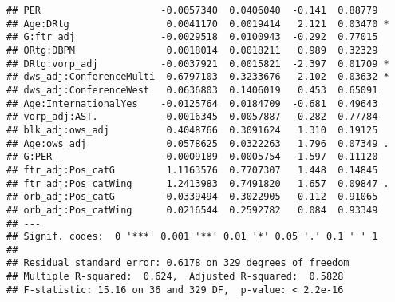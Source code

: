 \documentclass[]{article}
\begin{document}
\begin{verbatim}
## PER                     -0.0057340  0.0406040  -0.141  0.88779    
## Age:DRtg                 0.0041170  0.0019414   2.121  0.03470 *  
## G:ftr_adj               -0.0029518  0.0100943  -0.292  0.77015    
## ORtg:DBPM                0.0018014  0.0018211   0.989  0.32329    
## DRtg:vorp_adj           -0.0037921  0.0015821  -2.397  0.01709 *  
## dws_adj:ConferenceMulti  0.6797103  0.3233676   2.102  0.03632 *  
## dws_adj:ConferenceWest   0.0636803  0.1406019   0.453  0.65091    
## Age:InternationalYes    -0.0125764  0.0184709  -0.681  0.49643    
## vorp_adj:AST.           -0.0016345  0.0057887  -0.282  0.77784    
## blk_adj:ows_adj          0.4048766  0.3091624   1.310  0.19125    
## Age:ows_adj              0.0578625  0.0322263   1.796  0.07349 .  
## G:PER                   -0.0009189  0.0005754  -1.597  0.11120    
## ftr_adj:Pos_catG         1.1163576  0.7707307   1.448  0.14845    
## ftr_adj:Pos_catWing      1.2413983  0.7491820   1.657  0.09847 .  
## orb_adj:Pos_catG        -0.0339494  0.3022905  -0.112  0.91065    
## orb_adj:Pos_catWing      0.0216544  0.2592782   0.084  0.93349    
## ---
## Signif. codes:  0 '***' 0.001 '**' 0.01 '*' 0.05 '.' 0.1 ' ' 1
## 
## Residual standard error: 0.6178 on 329 degrees of freedom
## Multiple R-squared:  0.624,  Adjusted R-squared:  0.5828 
## F-statistic: 15.16 on 36 and 329 DF,  p-value: < 2.2e-16
\end{verbatim}
\end{document}
